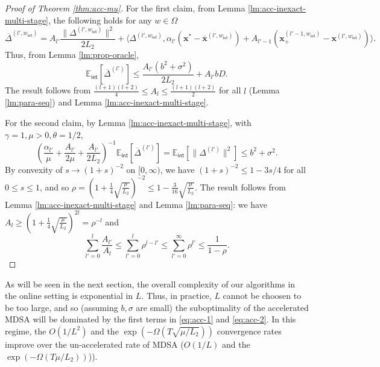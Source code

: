 \documentclass[11pt,fullpage,letterpaper]{article}
\newcommand{\mb}{\mathbf}
\newcommand{\E}{\mathbb{E}}
\newcommand{\internal}{\mathsf{int}}
\begin{document}
\begin{proof}[Proof of Theorem \ref{thm:acc-mu}]
    For the first claim, from Lemma \ref{lm:acc-inexact-multi-stage}, the following holds for any $w\in \Omega$
\begin{displaymath}
    \overline{\Delta}^{(l',w_{\internal})} =A_{l'}\frac{\|\Delta^{(l',w_{\internal})}\|^2}{2 L_2} +  \langle \Delta^{(l',w_{\internal})},\alpha_{l'}(\mb x^*-\overline{\mb x}^{(l',w_{\internal})}) + A_{l'-1}(\mb x_+^{(l'-1,w_{\internal})}-\mb x^{(l',w_{\internal})})\rangle.
\end{displaymath}
Thus, from Lemma \ref{lm:prop-oracle}, 
\begin{displaymath}
    \E_{\internal}[\overline{\Delta}^{(l')}] \leq \frac{A_{l'}(b^2+\sigma^2)}{2L_2} + A_{l'}bD. 
\end{displaymath}
The result follows from $\frac{(l+1)(l+2)}{4}\leq A_l\leq \frac{(l+1)(l+2)}{2}$ for all $l$ (Lemma \ref{lm:para-seq}) and Lemma \ref{lm:acc-inexact-multi-stage}.

For the second claim, by Lemma \ref{lm:acc-inexact-multi-stage}, with $\gamma = 1,\mu>0,\theta=1/2$,
    \begin{displaymath}
        (\frac{\alpha_{l'}}{\mu} + \frac{A_{l'}}{2\mu}+\frac{A_{l'}}{2L_2})^{-1}\E_{\internal}[\overline{\Delta}^{(l')}] =\E_{\internal}[\|\Delta^{(l')}\|^2]\leq b^2+\sigma^2.
    \end{displaymath}
By convexity of $s\to (1+s)^{-2}$ on $[0,\infty)$, we have $(1+s)^{-2}\leq 1-3s/4$ for all $0\leq s\leq 1$, and so $\rho =  (1+\frac{1}{4}\sqrt{\frac{\mu}{L_2}})^{-2}\leq 1-\frac{3}{16}\sqrt{\frac{\mu}{L_2}}$. The result follows from Lemma \ref{lm:acc-inexact-multi-stage} and Lemma \ref{lm:para-seq}: we have $A_l\geq  (1+\frac{1}{4}\sqrt{\frac{\mu}{L_2}})^{2l} = \rho^{-l}$ and
\begin{displaymath}
    \sum_{l'=0}^l \frac{A_{l'}}{A_l}\leq \sum_{l'=0}^{l} \rho^{l-l'}\leq \sum_{l'=0}^{\infty}  \rho^{l'}\leq \frac{1}{1-\rho}.
\end{displaymath}
\end{proof}


As will be seen in the next section, the overall complexity of our algorithms in the online setting is exponential in $L$. Thus, in practice, $L$ cannot be choosen to be too large, and so (assuming $b,\sigma$ are small) the suboptimality of the accelerated MDSA will be dominated by the first terms in \eqref{eq:acc-1} and \eqref{eq:acc-2}. In this regime, the $O(1/L^2)$ and the $\exp(-\Omega(T\sqrt{\mu/L_2}))$ convergence rates improve over the un-accelerated rate of MDSA ($O(1/L)$ and the $\exp(-\Omega(T\mu/L_2))$)). 
\end{document}
